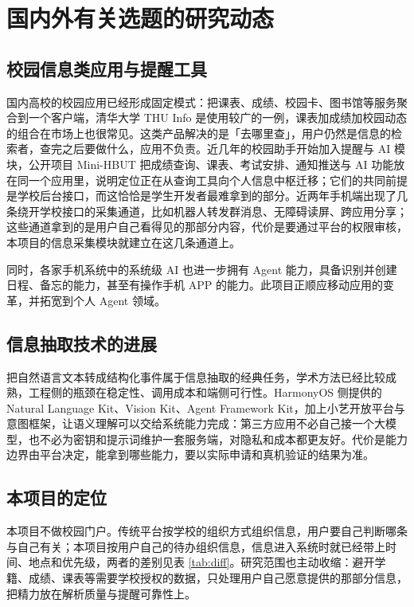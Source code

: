 \documentclass[12pt,a4paper,fontset=windows]{ctexart}
\begin{document}
\section{国内外有关选题的研究动态}

\subsection{校园信息类应用与提醒工具}

国内高校的校园应用已经形成固定模式：把课表、成绩、校园卡、图书馆等服务聚合到一个客户端，清华大学 THU Info 是使用较广的一例，课表加成绩加校园动态的组合在市场上也很常见。这类产品解决的是「去哪里查」，用户仍然是信息的检索者，查完之后要做什么，应用不负责。近几年的校园助手开始加入提醒与 AI 模块，公开项目 Mini-HBUT 把成绩查询、课表、考试安排、通知推送与 AI 功能放在同一个应用里，说明定位正在从查询工具向个人信息中枢迁移；它们的共同前提是学校后台接口，而这恰恰是学生开发者最难拿到的部分。近两年手机端出现了几条绕开学校接口的采集通道，比如机器人转发群消息、无障碍读屏、跨应用分享；这些通道拿到的是用户自己看得见的那部分内容，代价是要通过平台的权限审核，本项目的信息采集模块就建立在这几条通道上。

同时，各家手机系统中的系统级 AI 也进一步拥有 Agent 能力，具备识别并创建日程、备忘的能力，甚至有操作手机 APP 的能力。此项目正顺应移动应用的变革，并拓宽到个人 Agent 领域。

\subsection{信息抽取技术的进展}

把自然语言文本转成结构化事件属于信息抽取的经典任务，学术方法已经比较成熟，工程侧的瓶颈在稳定性、调用成本和端侧可行性。HarmonyOS 侧提供的 Natural Language Kit、Vision Kit、Agent Framework Kit，加上小艺开放平台与意图框架，让语义理解可以交给系统能力完成：第三方应用不必自己接一个大模型，也不必为密钥和提示词维护一套服务端，对隐私和成本都更友好。代价是能力边界由平台决定，能拿到哪些能力，要以实际申请和真机验证的结果为准。

\subsection{本项目的定位}

本项目不做校园门户。传统平台按学校的组织方式组织信息，用户要自己判断哪条与自己有关；本项目按用户自己的待办组织信息，信息进入系统时就已经带上时间、地点和优先级，两者的差别见表 \ref{tab:diff}。研究范围也主动收缩：避开学籍、成绩、课表等需要学校授权的数据，只处理用户自己愿意提供的那部分信息，把精力放在解析质量与提醒可靠性上。
\end{document}
